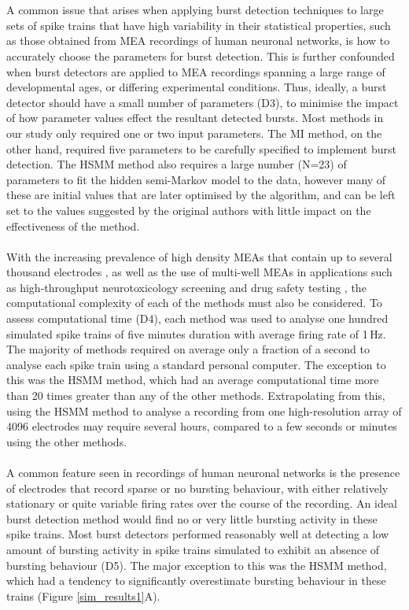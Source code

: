 \documentclass[12pt, titlepage]{article}
\begin{document}
	\\ \\ A common issue that arises when applying burst detection techniques to large sets of spike trains that have high variability in their statistical properties, such as those obtained from MEA recordings of human neuronal networks, is how to accurately choose the parameters for burst detection. This is further confounded when burst detectors are applied to MEA recordings spanning a large range of developmental ages, or differing experimental conditions. Thus, ideally, a burst detector should have a small number of parameters (D3), to minimise the impact of how parameter values effect the resultant detected bursts. Most methods in our study only required one or two input parameters. The MI method, on the other hand, required five parameters to be carefully specified to implement burst detection. The HSMM method also requires a large number (N=23) of parameters to fit the hidden semi-Markov model to the data, however many of these are initial values that are later optimised by the algorithm, and can be left set to the values suggested by the original authors with little impact on the effectiveness of the method. 
	\\ \\ With the increasing prevalence of high density MEAs that contain up to several thousand electrodes \cite{Maccione2014}, as well as the use of multi-well MEAs in applications such as high-throughput neurotoxicology screening \cite{Valdivia2014,Nicolas2014} and drug safety testing \cite{Gilchrist2015}, the computational complexity of each of the methods must also be considered. To assess computational time (D4), each method was used to analyse one hundred simulated spike trains of five minutes duration with average firing rate of 1$\,$Hz. The majority of methods required on average only a fraction of a second to analyse each spike train using a standard personal computer. The exception to this was the HSMM method, which had an average computational time more than 20 times greater than any of the other methods. Extrapolating from this, using the HSMM method to analyse a recording from one high-resolution array of 4096 electrodes may require several hours, compared to a few seconds or minutes using the other methods.
	\\ \\ A common feature seen in recordings of human neuronal networks is the presence of electrodes that record sparse or no bursting behaviour, with either relatively stationary or quite variable firing rates over the course of the recording. An ideal burst detection method would find no or very little bursting activity in these spike trains. Most burst detectors performed reasonably well at detecting a low amount of bursting activity in spike trains simulated to exhibit an absence of bursting behaviour (D5). The major exception to this was the HSMM method, which had a tendency to significantly overestimate bursting behaviour in these trains (Figure \ref{sim_results1}A). 
\end{document}
